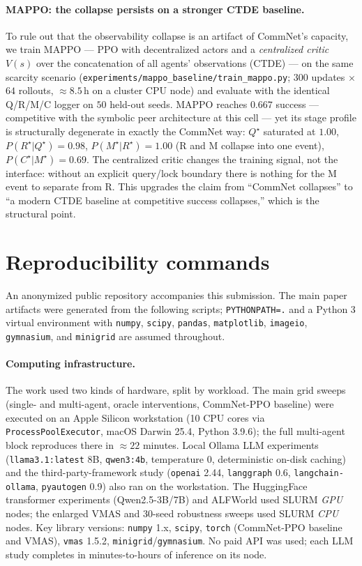 \documentclass{article}
\newcommand{\method}[1]{\texttt{#1}}
\begin{document}
\paragraph{MAPPO: the collapse persists on a stronger CTDE baseline.}
To rule out that the observability collapse is an artifact of CommNet's
capacity, we train MAPPO \citep{yu2022mappo} --- PPO with decentralized actors
and a \emph{centralized critic} $V(s)$ over the concatenation of all agents'
observations (CTDE) --- on the same scarcity scenario
(\method{experiments/mappo\_baseline/train\_mappo.py}; $300$ updates
$\times$ $64$ rollouts, $\approx8.5$\,h on a cluster CPU node) and evaluate with
the identical Q/R/M/C logger on $50$ held-out seeds. MAPPO reaches $0.667$
success --- competitive with the symbolic peer architecture at this cell ---
yet its stage profile is structurally degenerate in exactly the CommNet way:
$Q^\star$ saturated at $1.00$, $P(R^\star|Q^\star){=}0.98$,
$P(M^\star|R^\star){=}1.00$ (R and M collapse into one event),
$P(C^\star|M^\star){=}0.69$. The centralized critic changes the training
signal, not the interface: without an explicit query/lock boundary there is
nothing for the M event to separate from R. This upgrades the claim from
``CommNet collapses'' to ``a modern CTDE baseline at competitive success
collapses,'' which is the structural point.

\section{Reproducibility commands}
\label{p1:app:repro}

An anonymized public repository accompanies this submission. The main paper artifacts were generated from the following scripts; \texttt{PYTHONPATH=.} and a Python 3 virtual environment with \texttt{numpy}, \texttt{scipy}, \texttt{pandas}, \texttt{matplotlib}, \texttt{imageio}, \texttt{gymnasium}, and \texttt{minigrid} are assumed throughout.

\paragraph{Computing infrastructure.} The work used two kinds of
hardware, split by workload. The main grid sweeps (single- and
multi-agent, oracle interventions, CommNet-PPO baseline) were executed
on an Apple Silicon workstation (10 CPU cores via
\texttt{ProcessPoolExecutor}, macOS Darwin 25.4, Python 3.9.6); the
full multi-agent block reproduces there in ${\approx}22$ minutes.
Local Ollama LLM experiments (\texttt{llama3.1:latest} 8B,
\texttt{qwen3:4b}, temperature $0$, deterministic on-disk caching) and
the third-party-framework study (\texttt{openai} 2.44,
\texttt{langgraph} 0.6, \texttt{langchain-ollama}, \texttt{pyautogen}
0.9) also ran on the workstation. The HuggingFace transformer
experiments (Qwen2.5-3B/7B) and ALFWorld used SLURM \emph{GPU} nodes;
the enlarged VMAS and 30-seed robustness sweeps used SLURM \emph{CPU}
nodes. Key library versions: \texttt{numpy} 1.x, \texttt{scipy},
\texttt{torch} (CommNet-PPO baseline and VMAS), \texttt{vmas} 1.5.2,
\texttt{minigrid}/\texttt{gymnasium}. No paid API was used; each LLM
study completes in minutes-to-hours of inference on its node.
\end{document}

